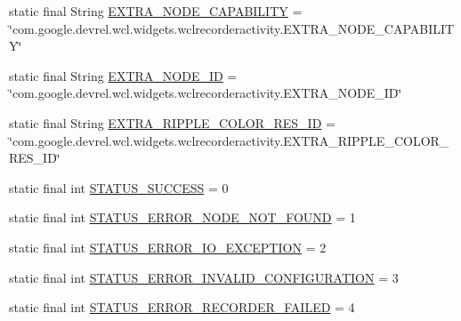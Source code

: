 \begin{DoxyCompactItemize}
\item 
static final String \hyperlink{classcom_1_1google_1_1devrel_1_1wcl_1_1widgets_1_1recording_1_1WclRecorderActivity_a7bd0e0e31dfd9a6a1378bc5998470e65}{E\+X\+T\+R\+A\+\_\+\+N\+O\+D\+E\+\_\+\+C\+A\+P\+A\+B\+I\+L\+I\+TY} = \char`\"{}com.\+google.\+devrel.\+wcl.\+widgets.\+wclrecorderactivity.\+E\+X\+T\+R\+A\+\_\+\+N\+O\+D\+E\+\_\+\+C\+A\+P\+A\+B\+I\+L\+I\+TY\char`\"{}
\item 
static final String \hyperlink{classcom_1_1google_1_1devrel_1_1wcl_1_1widgets_1_1recording_1_1WclRecorderActivity_af9724d687c9bc9c09865a162767767a0}{E\+X\+T\+R\+A\+\_\+\+N\+O\+D\+E\+\_\+\+ID} = \char`\"{}com.\+google.\+devrel.\+wcl.\+widgets.\+wclrecorderactivity.\+E\+X\+T\+R\+A\+\_\+\+N\+O\+D\+E\+\_\+\+ID\char`\"{}
\item 
static final String \hyperlink{classcom_1_1google_1_1devrel_1_1wcl_1_1widgets_1_1recording_1_1WclRecorderActivity_a4fc46389e5c23a882119e99b1b76e0b2}{E\+X\+T\+R\+A\+\_\+\+R\+I\+P\+P\+L\+E\+\_\+\+C\+O\+L\+O\+R\+\_\+\+R\+E\+S\+\_\+\+ID} = \char`\"{}com.\+google.\+devrel.\+wcl.\+widgets.\+wclrecorderactivity.\+E\+X\+T\+R\+A\+\_\+\+R\+I\+P\+P\+L\+E\+\_\+\+C\+O\+L\+O\+R\+\_\+\+R\+E\+S\+\_\+\+ID\char`\"{}
\item 
static final int \hyperlink{classcom_1_1google_1_1devrel_1_1wcl_1_1widgets_1_1recording_1_1WclRecorderActivity_a4631e92aa0ce773404a1acf457b6aff3}{S\+T\+A\+T\+U\+S\+\_\+\+S\+U\+C\+C\+E\+SS} = 0
\item 
static final int \hyperlink{classcom_1_1google_1_1devrel_1_1wcl_1_1widgets_1_1recording_1_1WclRecorderActivity_a4b4c947e0d87f688749786885282a1f8}{S\+T\+A\+T\+U\+S\+\_\+\+E\+R\+R\+O\+R\+\_\+\+N\+O\+D\+E\+\_\+\+N\+O\+T\+\_\+\+F\+O\+U\+ND} = 1
\item 
static final int \hyperlink{classcom_1_1google_1_1devrel_1_1wcl_1_1widgets_1_1recording_1_1WclRecorderActivity_a7c7ca2a3764cf5e6dc1f73deade0de1a}{S\+T\+A\+T\+U\+S\+\_\+\+E\+R\+R\+O\+R\+\_\+\+I\+O\+\_\+\+E\+X\+C\+E\+P\+T\+I\+ON} = 2
\item 
static final int \hyperlink{classcom_1_1google_1_1devrel_1_1wcl_1_1widgets_1_1recording_1_1WclRecorderActivity_a589e34600557e9c6c53a894e9bc76cd9}{S\+T\+A\+T\+U\+S\+\_\+\+E\+R\+R\+O\+R\+\_\+\+I\+N\+V\+A\+L\+I\+D\+\_\+\+C\+O\+N\+F\+I\+G\+U\+R\+A\+T\+I\+ON} = 3
\item 
static final int \hyperlink{classcom_1_1google_1_1devrel_1_1wcl_1_1widgets_1_1recording_1_1WclRecorderActivity_a7806794abe1851ef4bf387d01cc6e83d}{S\+T\+A\+T\+U\+S\+\_\+\+E\+R\+R\+O\+R\+\_\+\+R\+E\+C\+O\+R\+D\+E\+R\+\_\+\+F\+A\+I\+L\+ED} = 4
\end{DoxyCompactItemize}
